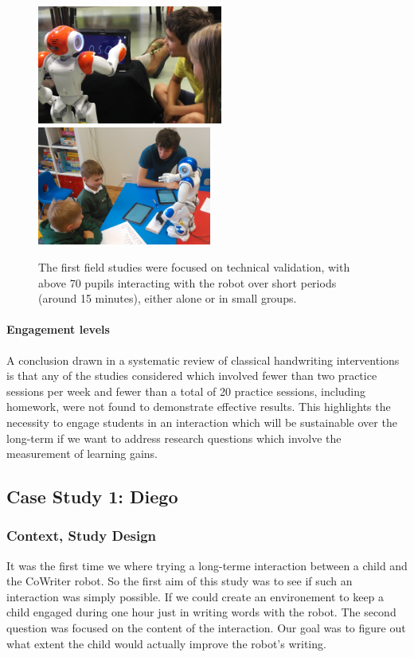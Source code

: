 \documentclass{article}
\begin{document}
\begin{figure}
    \centering
    \includegraphics[height=3.9cm]{schools}
    \includegraphics[height=3.9cm]{schools2}
    \caption{The first field studies were focused on technical validation, with
    above 70 pupils interacting with the robot over short periods (around 15
minutes), either alone or in small groups.}
    \label{fig:schools}
\end{figure}

\paragraph{Engagement levels}

A conclusion drawn in a systematic review of classical handwriting
interventions~\cite{Hoy2011} is that any of the studies considered which
involved fewer than two practice sessions per week and fewer than a total of 20
practice sessions, including homework, were not found to demonstrate effective
results. This highlights the necessity to engage students in an interaction
which will be sustainable over the long-term if we want to address research
questions which involve the measurement of learning gains.


\subsection{Case Study 1: Diego}

\subsubsection{Context, Study Design}
It was the first time we where trying a long-terme interaction between a child
and the CoWriter robot. So the first aim of this study was to see if such an
interaction was simply possible. If we could create an environement to keep a child engaged
during one hour just in writing words with the robot.
The second question was focused on the content of the interaction. Our goal was
to figure out what extent the child would actually improve the robot's
writing.\\
\end{document}
